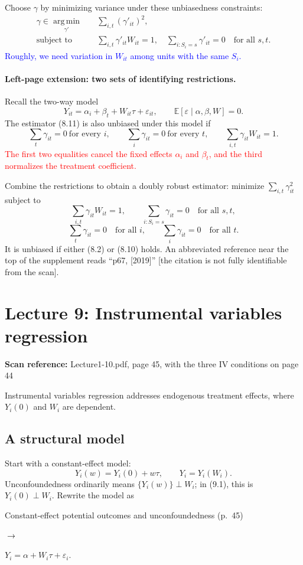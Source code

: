 \documentclass[11pt,a4paper]{article}
\newcommand{\sourcepages}[1]{\par{\small\sffamily\color{muted}\textbf{Scan reference:} #1\par}\nobreak\smallskip\nopagebreak[4]}
\newcommand{\inkblue}[1]{\textcolor{blue}{#1}}
\newcommand{\inkred}[1]{\textcolor{red}{#1}}
\newcommand{\notearrow}[3]{%
\par\Needspace{6\baselineskip}\smallskip
\noindent\begin{minipage}[c]{0.43\linewidth}\raggedright\color{#1}#2\end{minipage}%
\hfill\textcolor{#1}{\(\longrightarrow\)}\hfill%
\begin{minipage}[c]{0.43\linewidth}\raggedright#3\end{minipage}\par\smallskip}
\begin{document}
Choose $\gamma$ by minimizing variance under these unbiasedness constraints:
\begin{align*}
 \gamma\in\operatorname*{arg\,min}_{\gamma'}\quad&\sum_{i,t}(\gamma'_{it})^2,\\
 \text{subject to}\quad&\sum_{i,t}\gamma'_{it}W_{it}=1,
 \quad\sum_{i:S_i=s}\gamma'_{it}=0\quad\text{for all }s,t.\tag{8.14}
\end{align*}
\inkblue{Roughly, we need variation in $W_{it}$ among units with the same $S_i$.}

\paragraph{Left-page extension: two sets of identifying restrictions.}
Recall the two-way model
\[
 Y_{it}=\alpha_i+\beta_t+W_{it}\tau+\varepsilon_{it},
 \qquad\mathbb E[\varepsilon\mid\alpha,\beta,W]=0.\tag{8.2, recalled}
\]
The estimator (8.11) is also unbiased under this model if
\[
 \sum_t\gamma_{it}=0\ \text{for every }i,
 \qquad\sum_i\gamma_{it}=0\ \text{for every }t,
 \qquad\sum_{i,t}\gamma_{it}W_{it}=1.
\]
\inkred{The first two equalities cancel the fixed effects $\alpha_i$ and $\beta_t$, and the third normalizes the treatment coefficient.}

Combine the restrictions to obtain a doubly robust estimator: minimize $\sum_{i,t}\gamma_{it}^2$ subject to
\[
 \sum_{i,t}\gamma_{it}W_{it}=1,
 \qquad\sum_{i:S_i=s}\gamma_{it}=0\quad\text{for all }s,t,
\]
\[
 \sum_t\gamma_{it}=0\quad\text{for all }i,
 \qquad\sum_i\gamma_{it}=0\quad\text{for all }t.
\]
It is unbiased if either (8.2) or (8.10) holds. An abbreviated reference near the top of the supplement reads ``p67, [2019]'' [the citation is not fully identifiable from the scan].

\section{Lecture 9: Instrumental variables regression}
\sourcepages{Lecture1-10.pdf, page 45, with the three IV conditions on page 44}
Instrumental variables regression addresses endogenous treatment effects, where $Y_i(0)$ and $W_i$ are dependent.

\subsection{A structural model}
Start with a constant-effect model:
\[
 Y_i(w)=Y_i(0)+w\tau,\qquad Y_i=Y_i(W_i).\tag{9.1}
\]
Unconfoundedness ordinarily means $\{Y_i(w)\}\perp W_i$; in (9.1), this is $Y_i(0)\perp W_i$. Rewrite the model as
\notearrow{black}{Constant-effect potential outcomes and unconfoundedness (p.~45)}{$Y_i=\alpha+W_i\tau+\varepsilon_i$.}
\end{document}
